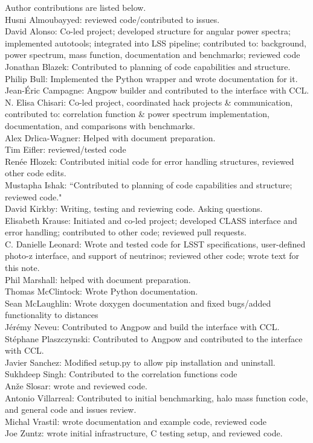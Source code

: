 Author contributions are listed below. \\
Husni Almoubayyed: reviewed code/contributed to issues. \\
David Alonso: Co-led project; developed structure for angular power spectra; implemented autotools; integrated into LSS pipeline; contributed to: background, power spectrum, mass function, documentation and benchmarks; reviewed code \\
Jonathan Blazek: Contributed to planning of code capabilities and structure. \\
Philip Bull: Implemented the Python wrapper and wrote documentation for it. \\
Jean-\'Eric Campagne: Angpow builder and contributed to the interface with CCL. \\
N. Elisa Chisari: Co-led project, coordinated hack projects \& communication, contributed to: correlation function \& power spectrum implementation, documentation, and comparisons with benchmarks. \\
Alex Drlica-Wagner: Helped with document preparation. \\
Tim Eifler: reviewed/tested code \\
Ren\'ee Hlozek: Contributed initial code for error handling structures, reviewed other code edits. \\
Mustapha Ishak: “Contributed to planning of code capabilities and structure; reviewed code." \\
David Kirkby: Writing, testing and reviewing code. Asking questions. \\
Elisabeth Krause: Initiated and co-led project; developed CLASS interface and error handling; contributed to other code; reviewed pull requests. \\
C. Danielle Leonard: Wrote and tested code for LSST specifications, user-defined photo-z interface, and support of neutrinos; reviewed other code; wrote text for this note. \\
Phil Marshall: helped with document preparation. \\
Thomas McClintock: Wrote Python documentation. \\
Sean McLaughlin: Wrote doxygen documentation and fixed bugs/added functionality to distances \\
J\'er\'emy Neveu: Contributed to Angpow and build the interface with CCL. \\
St\'ephane Plaszczynski: Contributed to Angpow and contributed to the interface with CCL. \\
Javier Sanchez: Modified setup.py to allow pip installation and uninstall. \\
Sukhdeep Singh: Contributed to the correlation functions code \\
An\v{z}e Slosar: wrote and reviewed code. \\
Antonio Villarreal: Contributed to initial benchmarking, halo mass function code, and general code and issues review. \\
Michal Vrastil: wrote documentation and example code, reviewed code \\
Joe Zuntz: wrote initial infrastructure, C testing setup, and reviewed code. \\
